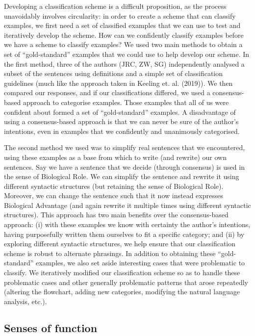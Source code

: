 \documentclass{article}
\begin{document}
Developing a classification scheme is a difficult proposition, as the process unavoidably involves circularity: in order to create a scheme that can classify examples, we first need a set of classified examples that we can use to test and iteratively develop the scheme.
How can we confidently classify examples before we have a scheme to classify examples?
We used two main methods to obtain a set of ``gold-standard'' examples that we could use to help develop our scheme.
In the first method, three of the authors (JRC, ZW, SG) independently analysed a subset of the sentences using definitions and a simple set of classification guidelines (much like the approach taken in Keeling et. al. (2019)).
We then compared our responses, and if our classifications differed, we used a consensus-based approach to categorise examples.
Those examples that all of us were confident about formed a set of ``gold-standard'' examples.
A disadvantage of using a consensus-based approach is that we can never be sure of the author's intentions, even in examples that we confidently and unanimously categorised.

The second method we used was to simplify real sentences that we encountered, using these examples as a base from which to write (and rewrite) our own sentences.
Say we have a sentence that we decide (through consensus) is used in the sense of Biological Role.
We can simplify the sentence and rewrite it using different syntactic structures (but retaining the sense of Biological Role).
Moreover, we can change the sentence such that it now instead expresses Biological Advantage (and again rewrite it multiple times using different syntactic structures).
This approach has two main benefits over the consensus-based approach: (i) with these examples we know with certainty the author's intentions, having purposefully written them ourselves to fit a specific category; and (ii) by exploring different syntactic structures, we help ensure that our classification scheme is robust to alternate phrasings.
In addition to obtaining these ``gold-standard'' examples, we also set aside interesting cases that were problematic to classify.
We iteratively modified our classification scheme so as to handle these problematic cases and other generally problematic patterns that arose repeatedly (altering the flowchart, adding new categories, modifying the natural language analysis, etc.).

\subsection{Senses of function}
\label{sec:senses-function}
\end{document}
